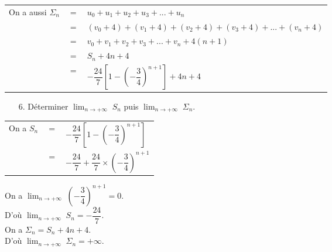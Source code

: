 \begin{tabular}{lll}
On a aussi $\Sigma_n$ & $=$ & $u_0 + u_1 + u_2 + u_3 + ... + u_n$ \\
& $=$ & $\left(v_0 + 4\right) + \left(v_1 + 4\right) + \left(v_2 + 4\right) + \left(v_3 + 4\right) + ... + \left(v_n + 4\right)$ \\
& $=$ & $v_0 + v_1 + v_2 + v_3 + ... + v_n + 4\left(n+1\right)$ \\
& $=$ & $S_n + 4n + 4$ \vspace*{.1cm} \\
& $=$ & $-\dfrac{24}{7}\left[1 - \left(-\dfrac{3}{4}\right)^{n+1}\right] + 4n + 4$ \\
\end{tabular}

\vspace*{.3cm}

\begin{itemize}
\item[6.] Déterminer $ \displaystyle {\lim_{n \rightarrow +\infty}} \; S_n$ puis $ \displaystyle {\lim_{n \rightarrow +\infty}} \; \Sigma_n$. \\
\end{itemize}

\begin{tabular}{lll}
On a $S_n$ & $=$ & $-\dfrac{24}{7} \left[1 - \left(-\dfrac{3}{4}\right)^{n+1}\right]$ \vspace*{.3cm} \\
& $=$ & $-\dfrac{24}{7} + \dfrac{24}{7} \times \left(-\dfrac{3}{4}\right)^{n+1}$ \\
\end{tabular}

\vspace*{.3cm}

On a $ \displaystyle {\lim_{n \rightarrow +\infty}} \; \left(-\dfrac{3}{4}\right)^{n+1} = 0$. \\

D'où $ \displaystyle {\lim_{n \rightarrow +\infty}} \; S_n = -\dfrac{24}{7}$. \\

On a $\Sigma_n = S_n + 4n + 4$. \\

D'où $ \displaystyle {\lim_{n \rightarrow +\infty}} \; \Sigma_n = +\infty$. 

\vspace*{-5cm}

\newpage

\vspace*{-2cm}

